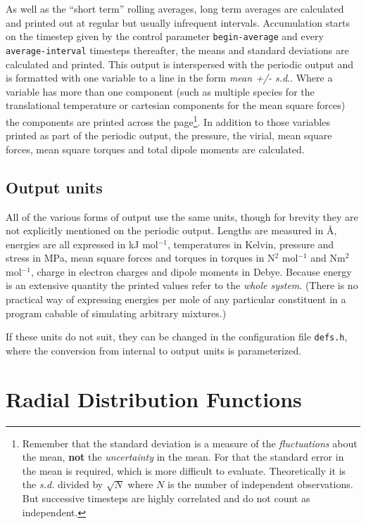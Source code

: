 As well as the ``short term'' rolling averages, long term averages are
calculated and printed out at regular but usually infrequent
intervals.  Accumulation starts on the timestep given by the control
parameter \verb'begin-average' and every \verb'average-interval'
timesteps thereafter, the means and standard deviations are calculated
and printed.  This output is interspersed with the periodic output and
is formatted with one variable to a line in the form {\em mean +/-
s.d}.. Where a variable has more than one component (such as
multiple species for the translational temperature or cartesian
components for the mean square forces) the components are printed
across the page\footnote{Remember that the standard deviation is a
measure of the {\em fluctuations\/} about the mean, {\bf not} the {\em
uncertainty\/} in the mean. For that the standard error in the mean is
required, which is more difficult to evaluate.  Theoretically it is
the {\em s.d.\/} divided by $\sqrt N$ where $N$ is the number of
independent observations.  But successive timesteps are highly
correlated and do not count as independent.}.  In addition to those
variables printed as part of the periodic output, the pressure, the
virial, mean square forces, mean square torques and total dipole
moments are calculated.

\subsection{Output units}
All of the various forms of output use the same units, though for
brevity they are not explicitly mentioned on the periodic output.
Lengths are measured in \AA, energies are all expressed in kJ
mol$^{-1}$, temperatures in Kelvin, pressure and stress in MPa, mean
square forces and torques in torques in N$^2$ mol$^{-1}$ and Nm$^2$
mol$^{-1}$, charge in electron charges and dipole moments in Debye.
Because energy is an extensive quantity the printed values refer to
the {\em whole system}.  (There is no practical way of expressing
energies per mole of any particular constituent in a program cabable
of simulating arbitrary mixtures.)

If these units do not suit, they can be changed in the configuration
file \verb'defs.h', where the conversion from internal to output units
is parameterized.
\section{Radial Distribution Functions}%

